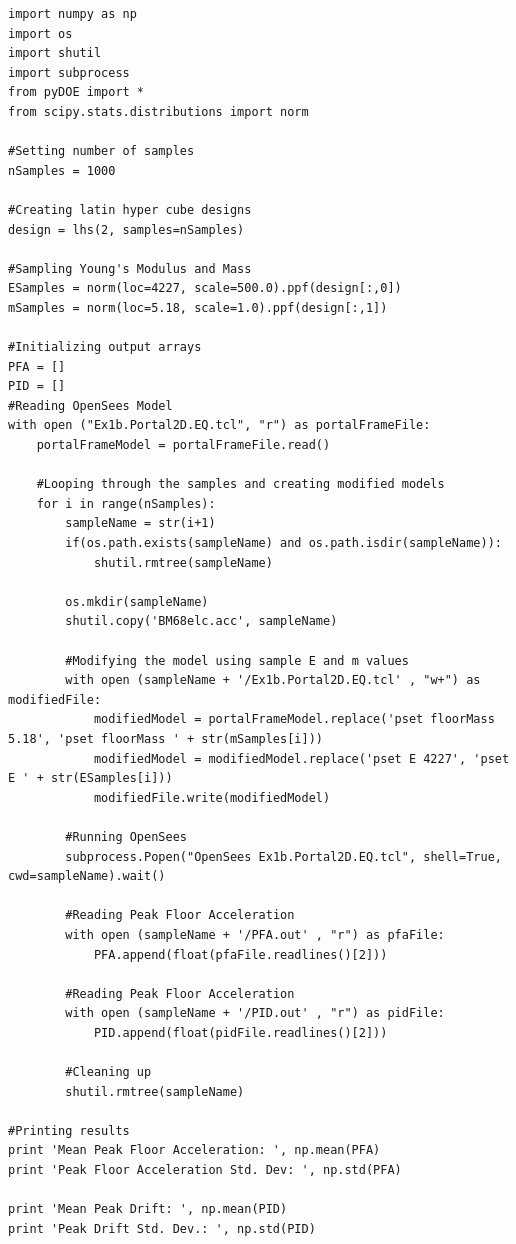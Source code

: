 {\tiny
\begin{lstlisting}[caption=Python script for analyzing the portal frame model with uncertain parameters]
import numpy as np
import os
import shutil
import subprocess
from pyDOE import *
from scipy.stats.distributions import norm

#Setting number of samples
nSamples = 1000

#Creating latin hyper cube designs
design = lhs(2, samples=nSamples)

#Sampling Young's Modulus and Mass
ESamples = norm(loc=4227, scale=500.0).ppf(design[:,0])
mSamples = norm(loc=5.18, scale=1.0).ppf(design[:,1])

#Initializing output arrays
PFA = []
PID = []
#Reading OpenSees Model
with open ("Ex1b.Portal2D.EQ.tcl", "r") as portalFrameFile:
    portalFrameModel = portalFrameFile.read()

    #Looping through the samples and creating modified models
    for i in range(nSamples):
        sampleName = str(i+1)
        if(os.path.exists(sampleName) and os.path.isdir(sampleName)):
            shutil.rmtree(sampleName)

        os.mkdir(sampleName)
        shutil.copy('BM68elc.acc', sampleName)

        #Modifying the model using sample E and m values
        with open (sampleName + '/Ex1b.Portal2D.EQ.tcl' , "w+") as modifiedFile:
            modifiedModel = portalFrameModel.replace('pset floorMass 5.18', 'pset floorMass ' + str(mSamples[i]))
            modifiedModel = modifiedModel.replace('pset E 4227', 'pset E ' + str(ESamples[i]))
            modifiedFile.write(modifiedModel)

        #Running OpenSees
        subprocess.Popen("OpenSees Ex1b.Portal2D.EQ.tcl", shell=True, cwd=sampleName).wait()

        #Reading Peak Floor Acceleration
        with open (sampleName + '/PFA.out' , "r") as pfaFile:
            PFA.append(float(pfaFile.readlines()[2]))

        #Reading Peak Floor Acceleration
        with open (sampleName + '/PID.out' , "r") as pidFile:
            PID.append(float(pidFile.readlines()[2]))

        #Cleaning up
        shutil.rmtree(sampleName)

#Printing results
print 'Mean Peak Floor Acceleration: ', np.mean(PFA)
print 'Peak Floor Acceleration Std. Dev: ', np.std(PFA)

print 'Mean Peak Drift: ', np.mean(PID)
print 'Peak Drift Std. Dev.: ', np.std(PID)

\end{lstlisting}
}


